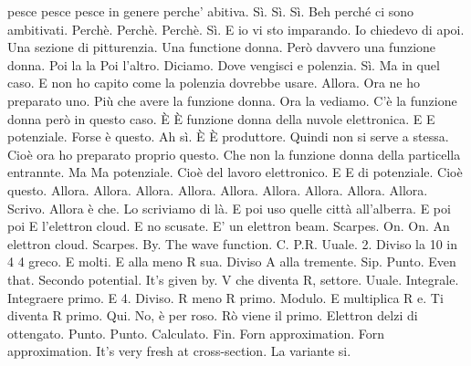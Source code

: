 \begin{soluzione}
pesce pesce pesce in genere perche' abitiva. Sì. Sì. Sì. Beh perché ci sono ambitivati. Perchè. Perchè. Perchè. Sì. E io vi sto imparando. Io chiedevo di apoi. Una sezione di pitturenzia. Una functione donna. Però davvero una funzione donna. Poi la la Poi l'altro. Diciamo. Dove vengisci e polenzia. Sì. Ma in quel caso. E non ho capito come la polenzia dovrebbe usare. Allora. Ora ne ho preparato uno. Più che avere la funzione donna. Ora la vediamo. C'è la funzione donna però in questo caso. È È funzione donna della nuvole elettronica. E E potenziale. Forse è questo. Ah sì. È È produttore. Quindi non si serve a stessa. Cioè ora ho preparato proprio questo. Che non la funzione donna della particella entrannte. Ma Ma potenziale. Cioè del lavoro elettronico. E E di potenziale. Cioè questo. Allora. Allora. Allora. Allora. Allora. Allora. Allora. Allora. Allora. Scrivo. Allora è che. Lo scriviamo di là. E poi uso quelle città all'alberra. E poi poi E l'elettron cloud. E no scusate. E' un elettron beam. Scarpes. On. On. An elettron cloud. Scarpes. By. The wave function. C. P.R. Uuale. 2. Diviso la 10 in 4 4 greco. E molti. E alla meno R sua. Diviso A alla tremente. Sip. Punto. Even that. Secondo potential. It's given by. V che diventa R, settore. Uuale. Integrale. Integraere primo. E 4. Diviso. R meno R primo. Modulo. E multiplica R e. Ti diventa R primo. Qui. No, è per roso. Rò viene il primo. Elettron delzi di ottengato. Punto. Punto. Calculato. Fin. Forn approximation. Forn approximation. It's very fresh at cross-section. La variante si. 
   

\end{soluzione}
